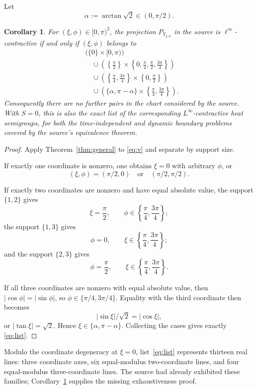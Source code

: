 \documentclass[11pt]{article}
\newtheorem{corollary}{Corollary}
\begin{document}
Let
\[
 \alpha:=\arctan\sqrt2\in(0,\pi/2).
\]

\begin{corollary}\label{cor:list}
For $(\xi,\phi)\in[0,\pi)^2$, the projection
$P_{Y_{\xi,\phi}}$ in the source is $\ell^\infty$-contractive if and only if
$(\xi,\phi)$ belongs to
\begin{align}\label{eq:list}
 &\bigl(\{0\}\times[0,\pi)\bigr) \\
 &\quad{}\cup
 \left(\left\{\frac\pi2\right\}\times
 \left\{0,\frac\pi4,\frac\pi2,\frac{3\pi}4\right\}\right) \\
 &\quad{}\cup
 \left(\left\{\frac\pi4,\frac{3\pi}4\right\}\times
 \left\{0,\frac\pi2\right\}\right) \\
 &\quad{}\cup
 \left(\{\alpha,\pi-\alpha\}\times
 \left\{\frac\pi4,\frac{3\pi}4\right\}\right).
\end{align}
Consequently there are no further pairs in the chart considered by the
source.  With $S=0$, this is also the exact list of the corresponding
$L^\infty$-contractive heat semigroups, for both the time-independent and
dynamic boundary problems covered by the source's equivalence theorem.
\end{corollary}

\begin{proof}
Apply Theorem~\ref{thm:general} to \eqref{eq:v} and separate by support size.

If exactly one coordinate is nonzero, one obtains $\xi=0$ with arbitrary
$\phi$, or
\[
 (\xi,\phi)=(\pi/2,0)\quad\text{or}\quad(\pi/2,\pi/2).
\]

If exactly two coordinates are nonzero and have equal absolute value, the
support $\{1,2\}$ gives
\[
 \xi=\frac\pi2,\qquad
 \phi\in\left\{\frac\pi4,\frac{3\pi}4\right\};
\]
the support $\{1,3\}$ gives
\[
 \phi=0,\qquad
 \xi\in\left\{\frac\pi4,\frac{3\pi}4\right\};
\]
and the support $\{2,3\}$ gives
\[
 \phi=\frac\pi2,\qquad
 \xi\in\left\{\frac\pi4,\frac{3\pi}4\right\}.
\]

If all three coordinates are nonzero with equal absolute value, then
$|\cos\phi|=|\sin\phi|$, so
$\phi\in\{\pi/4,3\pi/4\}$.  Equality with the third coordinate then becomes
\[
 |\sin\xi|/\sqrt2=|\cos\xi|,
\]
or $|\tan\xi|=\sqrt2$.  Hence
$\xi\in\{\alpha,\pi-\alpha\}$.  Collecting the cases gives exactly
\eqref{eq:list}.
\end{proof}

Modulo the coordinate degeneracy at $\xi=0$, list~\eqref{eq:list} represents
thirteen real lines: three coordinate axes, six equal-modulus two-coordinate
lines, and four equal-modulus three-coordinate lines.  The source had already
exhibited these families; Corollary~\ref{cor:list} supplies the missing
exhaustiveness proof.
\end{document}
